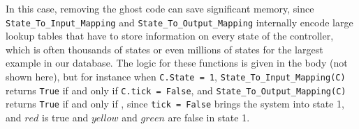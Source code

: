 \documentclass[runningheads]{llncs}
\begin{document}
In this case, removing the ghost code can save significant memory, 
since \lstinline{State_To_Input_Mapping} and \lstinline{State_To_Output_Mapping} 
internally encode large lookup tables that have to store information on every state of the controller, 
which is often thousands of states or even millions of states for the largest example in our database.
The logic for these functions is given in the body (not shown here), but for instance when \lstinline{C.State = 1}, 
\lstinline{State_To_Input_Mapping(C)} returns \lstinline{True} if and only if \lstinline{C.tick = False}, and 
\lstinline{State_To_Output_Mapping(C)} returns \lstinline{True} if and only if 
, 
since \lstinline{tick = False} brings the system into state 1, and $red$ is true and $yellow$ and $green$ are false in state 1.
 
\end{document}
